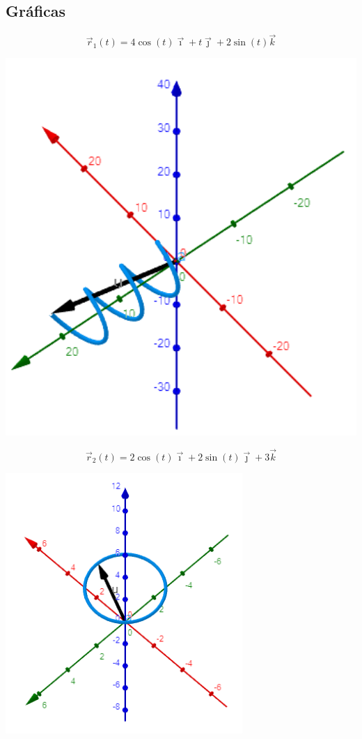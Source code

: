 \documentclass[letterpaper, 12pt]{article}
\begin{document}
\subsection*{Gráficas}
\[\vec{r}_1(t)=4\cos (t)\vec{\imath}+t\vec{\jmath}+2\sin (t)\vec{k}\]
\begin{center}
    \includegraphics[width=15cm]{grafica1.PNG}
\end{center}
\[\vec{r}_2(t)=2\cos (t)\vec{\imath}+2\sin (t)\vec{\jmath}+3\vec{k}\]
\begin{center}
    \includegraphics[width=9cm]{grafica2.PNG}
\end{center}
\end{document}
